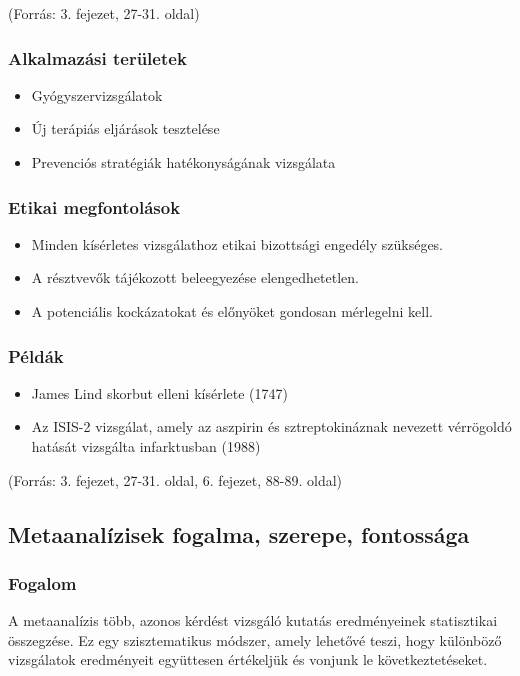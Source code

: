 \documentclass[a4paper,12pt]{article}
\begin{document}
(Forrás: 3. fejezet, 27-31. oldal)

\subsubsection{Alkalmazási területek}
\begin{itemize}
    \item Gyógyszervizsgálatok
    \item Új terápiás eljárások tesztelése
    \item Prevenciós stratégiák hatékonyságának vizsgálata
\end{itemize}

\subsubsection{Etikai megfontolások}
\begin{itemize}
    \item Minden kísérletes vizsgálathoz etikai bizottsági engedély szükséges.
    \item A résztvevők tájékozott beleegyezése elengedhetetlen.
    \item A potenciális kockázatokat és előnyöket gondosan mérlegelni kell.
\end{itemize}

\subsubsection{Példák}
\begin{itemize}
    \item James Lind skorbut elleni kísérlete (1747)
    \item Az ISIS-2 vizsgálat, amely az aszpirin és sztreptokináznak nevezett vérrögoldó hatását vizsgálta infarktusban (1988)
\end{itemize}

(Forrás: 3. fejezet, 27-31. oldal, 6. fejezet, 88-89. oldal)



\subsection{Metaanalízisek fogalma, szerepe, fontossága}

\subsubsection{Fogalom}
A metaanalízis több, azonos kérdést vizsgáló kutatás eredményeinek statisztikai összegzése. Ez egy szisztematikus módszer, amely lehetővé teszi, hogy különböző vizsgálatok eredményeit együttesen értékeljük és vonjunk le következtetéseket.
\end{document}
